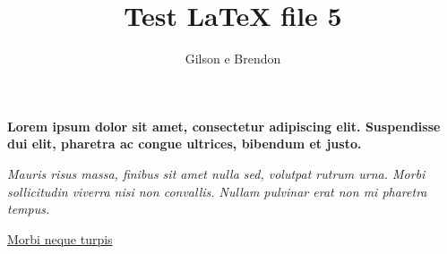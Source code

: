 \documentclass[12pt]{article}
\title{Test LaTeX file 5}
\author{Gilson e Brendon}
\begin{document}
\maketitle

\textbf{Lorem ipsum dolor sit amet, consectetur adipiscing elit. Suspendisse dui elit, pharetra ac congue ultrices, bibendum et justo.}

\textit{Mauris risus massa, finibus sit amet nulla sed, volutpat rutrum urna. Morbi sollicitudin viverra nisi non convallis. Nullam pulvinar erat non mi pharetra tempus.}

\underline{Morbi neque turpis}
\end{document}
